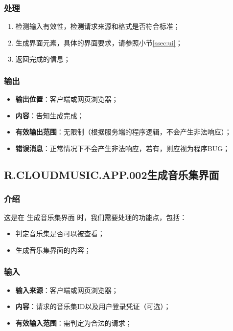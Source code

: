 \subsubsection{处理}
	\begin{enumerate}
		\item 检测输入有效性，检测请求来源和格式是否符合标准；
		\item 生成界面元素，具体的界面要求，请参照小节\ref{ssec:ui}；
		\item 返回完成的信息；
	\end{enumerate}
\subsubsection{输出}
\begin{itemize}
	\item \textbf{输出位置}：客户端或网页浏览器；
	\item \textbf{内容}：告知生成完成；
	\item \textbf{有效输出范围}：无限制（根据服务端的程序逻辑，不会产生非法响应）；
	\item \textbf{错误消息}：正常情况下不会产生非法响应，若有，则应视为程序BUG；
\end{itemize}

\subsection{R.CLOUDMUSIC.APP.002生成音乐集界面}
\subsubsection{介绍}
	这是在 生成音乐集界面 时，我们需要处理的功能点，包括：
	\begin{itemize}
		\item 判定音乐集是否可以被查看；
		\item 生成音乐集界面的内容；
	\end{itemize}
\subsubsection{输入}
	\begin{itemize}
		\item \textbf{输入来源}：客户端或网页浏览器；
		\item \textbf{内容}：请求的音乐集ID以及用户登录凭证（可选）；
		\item \textbf{有效输入范围}：需判定为合法的请求；
	\end{itemize}
